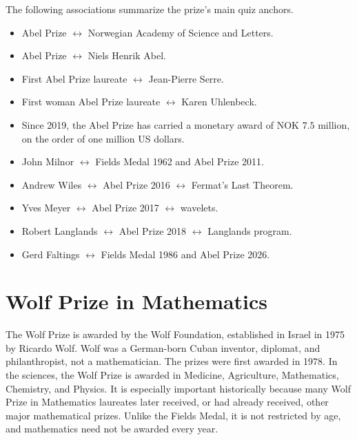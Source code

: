    \begin{fact}
        The following associations summarize the prize's main quiz anchors.
        \begin{itemize}
            \item Abel Prize $\leftrightarrow$ Norwegian Academy of Science and Letters.
            \item Abel Prize $\leftrightarrow$ Niels Henrik Abel.
            \item First Abel Prize laureate $\leftrightarrow$ Jean-Pierre Serre.
            \item First woman Abel Prize laureate $\leftrightarrow$ Karen Uhlenbeck.
            \item Since 2019, the Abel Prize has carried a monetary award of
                  NOK $7.5$ million, on the order of one million US dollars.
            \item John Milnor $\leftrightarrow$ Fields Medal 1962 and Abel Prize 2011.
            \item Andrew Wiles $\leftrightarrow$ Abel Prize 2016 $\leftrightarrow$ Fermat's Last
            Theorem.
            \item Yves Meyer $\leftrightarrow$ Abel Prize 2017 $\leftrightarrow$ wavelets.
            \item Robert Langlands $\leftrightarrow$ Abel Prize 2018 $\leftrightarrow$ Langlands
            program.
            \item Gerd Faltings $\leftrightarrow$ Fields Medal 1986 and Abel Prize 2026.
        \end{itemize}
    \end{fact}

    \section*{Wolf Prize in Mathematics}

    The Wolf Prize is awarded by the Wolf Foundation, established in Israel in
    1975 by Ricardo Wolf. Wolf was a German-born Cuban inventor, diplomat, and
    philanthropist, not a mathematician. The prizes were first awarded in 1978.
    In the sciences, the Wolf Prize is awarded in Medicine, Agriculture,
    Mathematics, Chemistry, and Physics. It is especially important
    historically because many Wolf Prize in Mathematics laureates later
    received, or had already received, other major mathematical prizes. Unlike
    the Fields Medal, it is not restricted by age, and mathematics need not be
    awarded every year.

